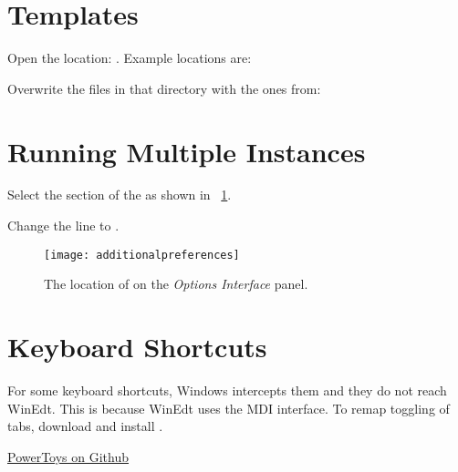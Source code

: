 \documentclass{lebook}
\begin{document}
\section{Templates}
   \begin{numberedlist}
       \item Open the location: .  Example locations are:
       \begin{plainlist}
           \item {}
           \item {}
       \end{plainlist}
       \item Overwrite the files in that directory with the ones from:
       \begin{plainlist}
           \item {}
       \end{plainlist}
   \end{numberedlist}

\section{Running Multiple Instances}
\begin{numberedlist}
	\item Select the  section of the  as shown in \figurename~\ref{fig:additionalpreferences}.
	\item Change the line  to .
\end{numberedlist}
\begin{figure}
	\centering
	\texttt{[image: additionalpreferences]}
	\caption{The location of  on the \textit{Options Interface} panel.}
	\label{fig:additionalpreferences}
\end{figure}


\section{Keyboard Shortcuts}
For some keyboard shortcuts, Windows intercepts them and they do not reach WinEdt.  This is because WinEdt uses the MDI interface.  To remap toggling of tabs, download and install .
\begin{plainlist}
	\item \href{https://github.com/microsoft/PowerToys}{PowerToys on Github}
\end{plainlist}
\end{document}

